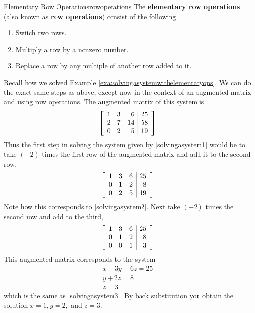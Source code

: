 \begin{definition}{Elementary Row Operations}{rowoperations}
The \textbf{elementary row operations} (also known as \textbf{row operations}) consist of the following  

\begin{enumerate}
\item Switch two rows.

\item Multiply a row by a nonzero number.


\item Replace a row by any multiple of another row added to it.
\end{enumerate}
\end{definition}

Recall how we solved Example \ref{exa:solvingasystemwithelementaryops}. 
We can do the exact same steps as above, except now in the context of an augmented matrix and using row operations. 
The augmented matrix of this system is 
\begin{equation*}
\left[ 
\begin{array}{rrr|r}
1 & 3 & 6 &  25 \\
2 & 7 & 14 &  58 \\
0 & 2 & 5 &  19
\end{array}
\right] 
\end{equation*}
Thus the first step in
solving the system given by \ref{solvingasystem1} would be to take $\left( -2\right) $ times the first row
of the augmented matrix and add it to the second row,
\begin{equation*}
\left[
\begin{array}{rrr|r}
1 & 3 & 6 & 25 \\
0 & 1 & 2 & 8 \\
0 & 2 & 5 & 19
\end{array}
\right] 
\end{equation*}
Note how this corresponds to \ref{solvingasystem2}. Next take $\left( -2\right) $
times the second row and add to the third,
\begin{equation*}
\left[ 
\begin{array}{rrr|r}
1 & 3 & 6 & 25 \\
0 & 1 & 2 & 8 \\
0 & 0 & 1 & 3
\end{array}
\right]
\end{equation*}
This augmented matrix corresponds to the system
\begin{equation*}
\begin{array}{c}
x+3y+6z=25 \\
y+2z=8 \\
z=3
\end{array}
\end{equation*}
which is the same as \ref{solvingasystem3}. By back substitution you obtain the solution
$x=1,y=2,$ and $z=3.$

